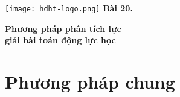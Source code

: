 \newcommand{\chapter}[2][]{
	\newcommand{\chapname}{#2}
	\begin{flushleft}
		\begin{minipage}[t]{\linewidth}
			\texttt{[image: hdht-logo.png]}
			\hspace{0pt}	
			\sffamily\bfseries\large Bài  20.
			\begin{flushleft}
				\LARGE\bfseries #1
			\end{flushleft}
		\end{minipage}
	\end{flushleft}
	\vspace{1cm}
	\normalfont\normalsize
}
\chapter[Phương pháp phân tích lực \\giải bài toán động lực học]{Phương pháp phân tích lực giải bài toán động lực học}
\section{Phương pháp chung}

